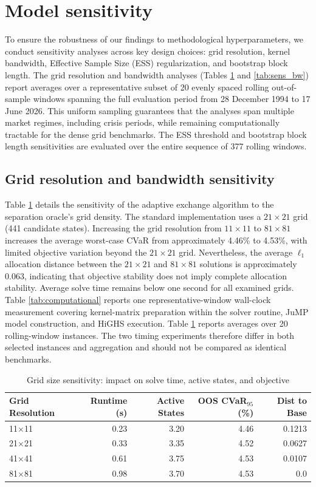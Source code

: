 \documentclass[smallextended]{svjour3}
\begin{document}
\section{Model sensitivity}
\label{sec:sensitivity}
To ensure the robustness of our findings to methodological hyperparameters, we conduct sensitivity analyses across key design choices: grid resolution, kernel bandwidth, Effective Sample Size (ESS) regularization, and bootstrap block length. The grid resolution and bandwidth analyses (Tables \ref{tab:sens_grid} and \ref{tab:sens_bw}) report averages over a representative subset of 20 evenly spaced rolling out-of-sample windows spanning the full evaluation period from 28 December 1994 to 17 June 2026. This uniform sampling guarantees that the analyses span multiple market regimes, including crisis periods, while remaining computationally tractable for the dense grid benchmarks. The ESS threshold and bootstrap block length sensitivities are evaluated over the entire sequence of 377 rolling windows.

\subsection{Grid resolution and bandwidth sensitivity}
Table \ref{tab:sens_grid} details the sensitivity of the adaptive exchange algorithm to the separation oracle's grid density. The standard implementation uses a $21\times21$ grid (441 candidate states). Increasing the grid resolution from $11\times11$ to $81\times81$ increases the average worst-case CVaR from approximately 4.46\% to 4.53\%, with limited objective variation beyond the $21\times21$ grid. Nevertheless, the average $\ell_1$ allocation distance between the $21\times21$ and $81\times81$ solutions is approximately 0.063, indicating that objective stability does not imply complete allocation stability. Average solve time remains below one second for all examined grids. Table \ref{tab:computational} reports one representative-window wall-clock measurement covering kernel-matrix preparation within the solver routine, JuMP model construction, and HiGHS execution. Table \ref{tab:sens_grid} reports averages over 20 rolling-window instances. The two timing experiments therefore differ in both selected instances and aggregation and should not be compared as identical benchmarks.

\begin{table}[htbp]
\centering
\caption{Grid size sensitivity: impact on solve time, active states, and objective}
\label{tab:sens_grid}
\begin{tabular}{lrrrr}
\toprule
\textbf{Grid Resolution} & \textbf{Runtime (s)} & \textbf{Active States} & \textbf{OOS CVaR$_{95}$ (\%)} & \textbf{Dist to Base} \\
\midrule
11$\times$11 & 0.23 & 3.20 & 4.46 & 0.1213 \\
21$\times$21 & 0.33 & 3.35 & 4.52 & 0.0627 \\
41$\times$41 & 0.61 & 3.75 & 4.53 & 0.0107 \\
81$\times$81 & 0.98 & 3.70 & 4.53 & 0.0 \\
\bottomrule
\end{tabular}
\end{table}
\end{document}

